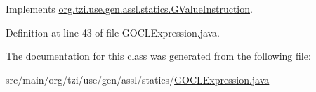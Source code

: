 Implements \hyperlink{interfaceorg_1_1tzi_1_1use_1_1gen_1_1assl_1_1statics_1_1_g_value_instruction_a8fb7e593c2822d29ca840961f1f19df3}{org.\-tzi.\-use.\-gen.\-assl.\-statics.\-G\-Value\-Instruction}.



Definition at line 43 of file G\-O\-C\-L\-Expression.\-java.



The documentation for this class was generated from the following file\-:\begin{DoxyCompactItemize}
\item 
src/main/org/tzi/use/gen/assl/statics/\hyperlink{_g_o_c_l_expression_8java}{G\-O\-C\-L\-Expression.\-java}\end{DoxyCompactItemize}
